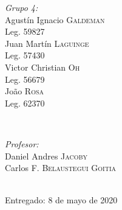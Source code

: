 \begin{titlepage}
    \begin{minipage}{0.4\textwidth}
    \begin{flushleft} \large
    \emph{Grupo 4:}\\		%
    [.3cm]
   Agust\'in Ignacio \textsc{Galdeman}\\
    Leg. 59827\\ 
    [.3cm]
    Juan Mart\'in \textsc{Laguinge}\\
    Leg. 57430\\ 
    [.3cm]
    Victor Christian \textsc{Oh}\\
    Leg. 56679\\ 
    [.3cm]
    Jo\~ao \textsc{Rosa}\\
    Leg. 62370 \\ 
    [.3cm]
    \end{flushleft}
    \end{minipage}
    ~
    \begin{minipage}{0.4\textwidth}
    \begin{flushright} \large
    \emph{Profesor:} \\
    [.3cm]
    Daniel Andres  \textsc{Jacoby}\\ %
    [.3cm]
    Carlos F. \textsc{Belaustegui Goitia}\\
    \end{flushright}
    \end{minipage}\\[2cm]
        
        
        
    \vfill
    {\large Entregado: 8 de mayo de 2020}\\[2cm] %
        
        
         
        
        
    \end{titlepage}